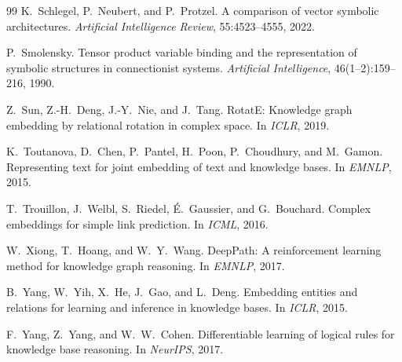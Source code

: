 \documentclass[11pt]{article}
\theoremstyle{definition}
\begin{document}
\begin{thebibliography}{99}
K.~Schlegel, P.~Neubert, and P.~Protzel.
\newblock A comparison of vector symbolic architectures.
\newblock \emph{Artificial Intelligence Review}, 55:4523--4555, 2022.

P.~Smolensky.
\newblock Tensor product variable binding and the representation of symbolic
structures in connectionist systems.
\newblock \emph{Artificial Intelligence}, 46(1--2):159--216, 1990.

Z.~Sun, Z.-H.~Deng, J.-Y.~Nie, and J.~Tang.
\newblock RotatE: Knowledge graph embedding by relational rotation in complex
space.
\newblock In \emph{ICLR}, 2019.

K.~Toutanova, D.~Chen, P.~Pantel, H.~Poon, P.~Choudhury, and M.~Gamon.
\newblock Representing text for joint embedding of text and knowledge bases.
\newblock In \emph{EMNLP}, 2015.

T.~Trouillon, J.~Welbl, S.~Riedel, \'E.~Gaussier, and G.~Bouchard.
\newblock Complex embeddings for simple link prediction.
\newblock In \emph{ICML}, 2016.

W.~Xiong, T.~Hoang, and W.~Y.~Wang.
\newblock DeepPath: A reinforcement learning method for knowledge graph
reasoning.
\newblock In \emph{EMNLP}, 2017.

B.~Yang, W.~Yih, X.~He, J.~Gao, and L.~Deng.
\newblock Embedding entities and relations for learning and inference in
knowledge bases.
\newblock In \emph{ICLR}, 2015.

F.~Yang, Z.~Yang, and W.~W.~Cohen.
\newblock Differentiable learning of logical rules for knowledge base reasoning.
\newblock In \emph{NeurIPS}, 2017.

\end{thebibliography}
\end{document}
